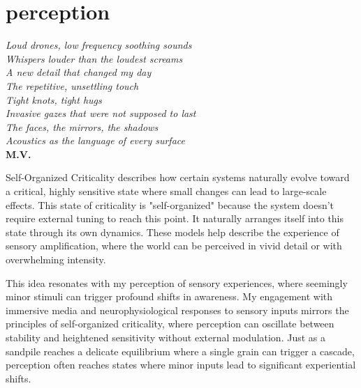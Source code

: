 \chapter*{perception}
\begin{center}
\vspace{2cm}
\begin{flushright}
\textit{Loud drones, low frequency soothing sounds\\Whispers louder than the loudest screams\\A new detail that changed my day\\The repetitive, unsettling touch\\Tight knots, tight hugs\\Invasive gazes that were not supposed to last\\The faces, the mirrors, the shadows\\Acoustics as the language of every surface}\\
\textbf{M.V.} 
\end{flushright}
\vspace{2cm}
\end{center}
\normalsize

\newpage  %
Self-Organized Criticality describes how certain systems naturally evolve toward a critical, highly sensitive state where small changes can lead to large-scale effects. This state of criticality is "self-organized" because the system doesn't require external tuning to reach this point. It naturally arranges itself into this state through its own dynamics. These models help describe the experience of sensory amplification, where the world can be perceived in vivid detail or with overwhelming intensity. \citep{adami1993}

This idea resonates with my perception of sensory experiences, where seemingly minor stimuli can trigger profound shifts in awareness. My engagement with immersive media and neurophysiological responses to sensory inputs mirrors the principles of self-organized criticality, where perception can oscillate between stability and heightened sensitivity without external modulation. Just as a sandpile reaches a delicate equilibrium where a single grain can trigger a cascade, perception often reaches states where minor inputs lead to significant experiential shifts.

